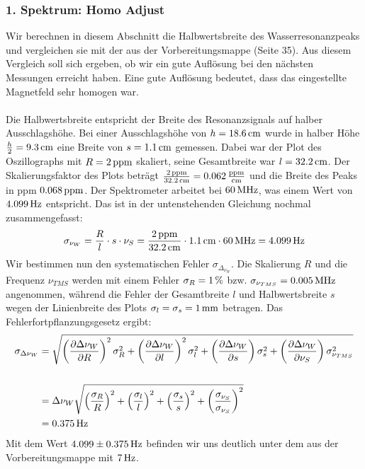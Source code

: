 \documentclass[a4paper,titlepage]{scrartcl}
\numberwithin{equation}{section}
\begin{document}
\subsubsection{1. Spektrum: Homo Adjust}
Wir berechnen in diesem Abschnitt die Halbwertsbreite des Wasserresonanzpeaks und vergleichen sie mit der aus der Vorbereitungsmappe (Seite 35). Aus diesem Vergleich soll sich ergeben, ob wir ein gute Auflösung bei den nächsten Messungen erreicht haben. Eine gute Auflösung bedeutet, dass das eingestellte Magnetfeld sehr homogen war.\\ \\
Die Halbwertsbreite entspricht der Breite des Resonanzsignals auf halber Ausschlagshöhe. Bei einer Ausschlagshöhe von $h=\unit[18.6]{cm}$ wurde in halber Höhe $\frac{h}{2}=\unit[9.3]{cm}$ eine Breite von $s=\unit[1.1]{cm}$ gemessen. Dabei war der Plot des Oszillographs mit $R=\unit[2]{ppm}$ skaliert, seine Gesamtbreite war $l=\unit[32.2]{cm}$. Der Skalierungsfaktor des Plots beträgt $\frac{\unit[2]{ppm}}{\unit[32.2]{cm}}=\unit[0.062]{\frac{ppm}{cm}}$ und die Breite des Peaks in ppm $\unit[0.068]{ppm}$. Der Spektrometer arbeitet bei $\unit[60]{MHz}$, was einem Wert von $\unit[4.099]{Hz}$ entspricht. Das ist in der untenstehenden Gleichung nochmal zusammengefasst:
\begin{equation*}
\sigma_{\nu_W}=\frac{R}{l} \cdot s \cdot \nu_{S}=\frac{\unit[2]{ppm}}{\unit[32.2]{cm}} \cdot \unit[1.1]{cm} \cdot \unit[60]{MHz}=\unit[4.099]{Hz}
\end{equation*}
Wir bestimmen nun den systematischen Fehler $\sigma_{\Delta_{\nu_W}}$. Die Skalierung $R$ und die Frequenz $\nu_{TMS}$ werden mit einem Fehler $\sigma_R=\unit[1]{\%}$ bzw. $\sigma_{\nu_{TMS}}=\unit[0.005]{MHz}$ angenommen, während die Fehler der Gesamtbreite $l$ und Halbwertsbreite $s$ wegen der Linienbreite des Plots $\sigma_l=\sigma_s=\unit[1]{mm}$ betragen. Das Fehlerfortpflanzungsgesetz ergibt:
\begin{align*}
\sigma_{\Delta \nu_W}&=\sqrt{\left( \frac{\partial \Delta \nu_W}{\partial R} \right)^2 \sigma^2_R + \left( \frac{\partial \Delta \nu_W}{\partial l} \right)^2 \sigma^2_l + \left( \frac{\partial \Delta \nu_W}{\partial s} \right) \sigma^2_s + \left( \frac{\partial \Delta \nu_W}{\partial \nu_{S}} \right) \sigma^2_{\nu_{TMS}}}\\ \\
&=\Delta \nu_W \sqrt{\left( \frac{\sigma_R}{R} \right)^2 + \left( \frac{\sigma_l}{l} \right)^2 + \left( \frac{\sigma_s}{s} \right)^2 + \left( \frac{\sigma_{\nu_{S}}}{\sigma_{\nu_{S}}} \right)^2}\\
&=\unit[0.375]{Hz}
\end{align*}
Mit dem Wert $\unit[4.099\pm0.375]{Hz}$ befinden wir uns deutlich unter dem aus der Vorbereitungsmappe mit $\unit[7]{Hz}$.
\end{document}
